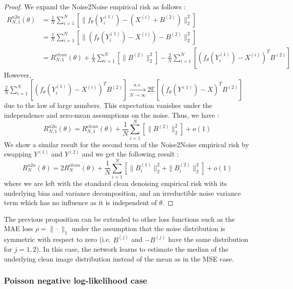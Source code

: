 \begin{proof}
    We expand the Noise2Noise empirical risk as follows :
    \begin{align*}
        R_{N,1}^{n2n}(\theta) &= \frac{1}{N} \sum_{i=1}^N \left[ \| f_\theta(Y_i^{(1)}) - (X^{(i)} + B^{(2)}) \|_2^2 \right] \\
        &= \frac{1}{N} \sum_{i=1}^N \left[ \|( f_\theta(Y_i^{(1)}) - X^{(i)}) - B^{(2)} \|_2^2 \right] \\
        &= R_{N,1}^{clean}(\theta) + \frac{1}{N} \sum_{i=1}^N \left[ \| B^{(2)} \|_2^2 \right] - \frac{2}{N} \sum_{i=1}^N \left[ (f_\theta(Y_i^{(1)}) - X^{(i)})^T B^{(2)} \right]
    \end{align*}
    However, $\frac{2}{N} \sum_{i=1}^N \left[ (f_\theta(Y_i^{(1)}) - X^{(i)})^T B^{(2)} \right] \xrightarrow[N \to \infty]{a.s.} 2 \mathbb{E} \left[ (f_\theta(Y^{(1)}) - X)^T B^{(2)} \right]$ due to the law of large numbers. This expectation vanishes under the independence and zero-mean assumptions on the noise.
    Thus, we have :
    \begin{equation*}
        R_{N,1}^{n2n}(\theta) = R_{N,1}^{clean}(\theta) + \frac{1}{N} \sum_{i=1}^N \left[ \| B^{(2)} \|_2^2 \right] + o(1)
    \end{equation*}
    We show a similar result for the second term of the Noise2Noise empirical risk by swapping $Y^{(1)}$ and $Y^{(2)}$ and we get the following result :
    \begin{equation*}
        R_{N}^{n2n}(\theta) = 2 R_{N}^{clean}(\theta) + \frac{1}{N} \sum_{i=1}^N \left[ \| B_i^{(1)} \|_2^2 + \| B_i^{(2)} \|_2^2 \right] + o(1)
    \end{equation*}
    where we are left with the standard clean denoising empirical risk with its underlying bias and variance decomposition, and an irreductible noise variance term which has no influence as it is independent of $\theta$.
\end{proof}

\begin{remark}
    The previous proposition can be extended to other loss functions such as the MAE loss $\rho = \| \cdot \|_1$ under the assumption that the noise distribution is symmetric with respect to zero (i.e. $B^{(j)}$ and $-B^{(j)}$ have the same distribution for $j = 1, 2$).
    In this case, the network learns to estimate the median of the underlying clean image distribution instead of the mean as in the MSE case.
\end{remark}

\subsubsection{Poisson negative log-likelihood case}
\label{sec:noise2noise_poisson}


